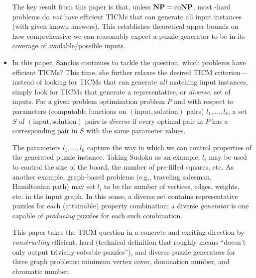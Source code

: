 \begin{itemize}
\begin{annotation}
      The key result from this paper is that, unless \(\mathbf{NP} = \operatorname{co}\!{\mathbf{NP}}\), most
      \NP-hard problems do \emph{not} have efficient TICMs that can generate
      all input instances (with given known answers).  This establishes
      theoretical upper bounds on how comprehensive we can reasonably expect a
      puzzle generator to be in its coverage of available/possible inputs.
    \end{annotation}

  \item {}

    \begin{annotation}
      In this paper, Sanchis continues to tackle the question, which problems
      have efficient TICMs?  This time, she further relaxes the desired TICM
      criterion---instead of looking for TICMs that can generate \emph{all}
      matching input instances, simply look for TICMs that generate a
      representative, or \emph{diverse}, set of inputs.  For a given problem
      optimization problem \(P\) and with respect to parameters (computable
      functions on \((\text{input}, \text{solution})\) pairs) \(l_1, \dots,
      l_k\), a set \(S\) of \((\text{input}, \text{solution})\) pairs is
      \emph{diverse} if every optimal pair in \(P\) has a corresponding pair in
      \(S\) with the same parameter values.

      The parameters \(l_1, \dotsc, l_k\) capture the way in which we can
      control properties of the generated puzzle instance.  Taking Sudoku as an
      example, \(l_i\) may be used to control the size of the board, the number
      of pre-filled squares, etc.  As another example, graph-based problems
      (e.g., traveling salesman, Hamiltonian path) may set \(l_i\) to be the
      number of vertices, edges, weights, etc. in the input graph.  In this
      sense, a diverse set contains representative puzzles for each
      (attainable) property combination; a diverse \emph{generator} is one
      capable of \emph{producing} puzzles for each such combination.

      This paper takes the TICM question in a concrete and exciting direction
      by \emph{constructing} efficient, hard (technical definition that roughly
      means ``doesn't only output trivially-solvable puzzles''), and diverse
      puzzle generators for three graph problems: minimum vertex cover,
      domination number, and chromatic number.
    \end{annotation}


\end{itemize}
